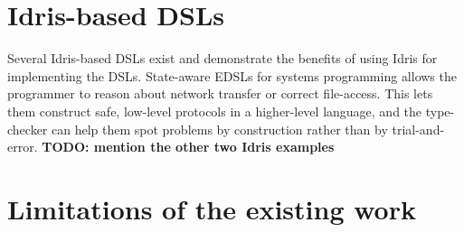 \section{Idris-based DSLs}
	Several Idris-based DSLs exist and demonstrate the benefits of using Idris for implementing the DSLs. State-aware EDSLs for systems programming \cite{10.1007/978-3-642-27694-1_18} allows the programmer to reason about network transfer or correct file-access. This lets them construct safe, low-level protocols in a higher-level language, and the type-checker can help them spot problems by construction \cite{10.1007/978-3-642-27694-1_18} rather than by trial-and-error. \textbf{TODO: mention the other two Idris examples}

\section{Limitations of the existing work}
